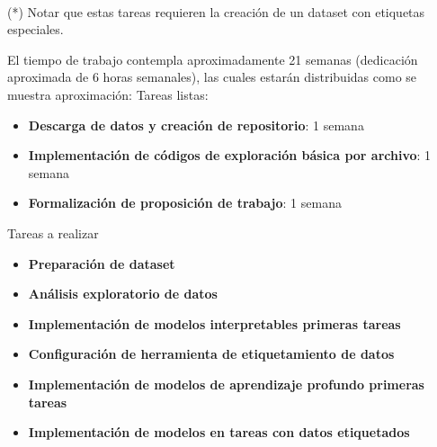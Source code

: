 \documentclass[
	spanish, %
	letterpaper, oneside
]{article}
\begin{document}
\\ (*) Notar que estas tareas requieren la creación de un dataset con etiquetas especiales.



El tiempo de trabajo contempla aproximadamente 21 semanas (dedicación aproximada de 6 horas semanales), las cuales estarán distribuidas como se muestra aproximación:
\newp Tareas listas:
\begin{itemize}
    \item \textbf{Descarga de datos y creación de repositorio}: 1 semana
    \item \textbf{Implementación de códigos de exploración básica por archivo}: 1 semana
    \item \textbf{Formalización de proposición de trabajo}: 1 semana
\end{itemize}

\newp Tareas a realizar
\begin{itemize}
    \item \textbf{Preparación de dataset}
    \item \textbf{Análisis exploratorio de datos}
    \item \textbf{Implementación de modelos interpretables primeras tareas}
    \item \textbf{Configuración de herramienta de etiquetamiento de datos}
    \item \textbf{Implementación de modelos de aprendizaje profundo primeras tareas}
    \item \textbf{Implementación de modelos en tareas con datos etiquetados}
\end{itemize}


\end{document}
